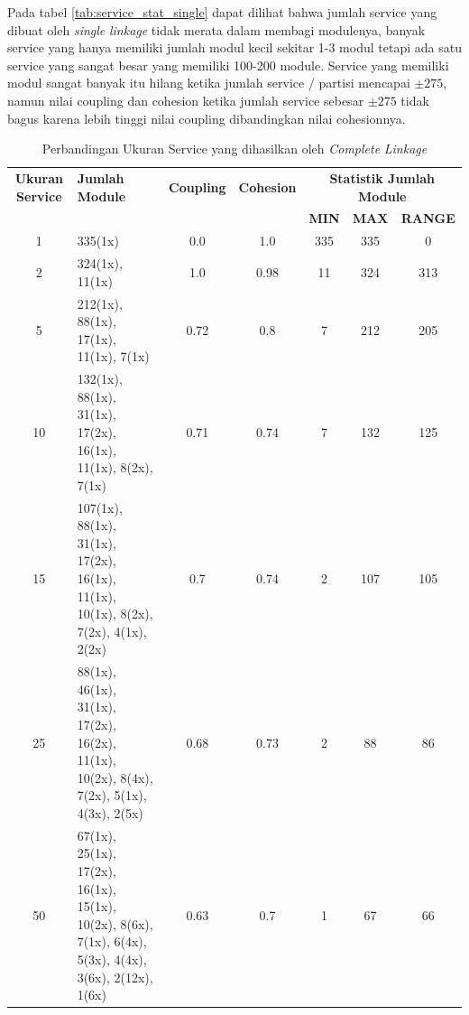 Pada tabel \ref{tab:service_stat_single} dapat dilihat bahwa jumlah service yang dibuat oleh \textit{single} \textit{linkage} tidak merata dalam membagi modulenya, banyak service yang hanya memiliki jumlah modul kecil sekitar 1-3 modul tetapi ada satu service yang sangat besar yang memiliki 100-200 module. Service yang memiliki modul sangat banyak itu hilang ketika jumlah service / partisi mencapai $\pm 275$, namun nilai coupling dan cohesion ketika jumlah service sebesar $\pm 275$ tidak bagus karena lebih tinggi nilai coupling dibandingkan nilai cohesionnya.


\begingroup
\setlength{\LTleft}{-20cm plus -1fill}
\setlength{\LTright}{\LTleft}
\begin{small}
\begin{longtable}{|c|p{4cm}|c|c|c|c|c|}
		\caption{Perbandingan Ukuran Service yang dihasilkan oleh \textit{Complete} \textit{Linkage}}
		\label{tab:service_stat_complete} \\
		\hline
		\textbf{Ukuran Service} & \textbf{Jumlah Module} & \textbf{Coupling} & \textbf{Cohesion} & \multicolumn{3}{c|}{\textbf{Statistik Jumlah Module}} \\
		\cline{5-7}
		&  &  &  & \textbf{MIN} & \textbf{MAX} & \textbf{RANGE} \\
		\hline
		\endfirsthead
		\hline  
		1 & 335(1x) & \cellcolor{colorGood}  0.0 & \cellcolor{colorGood} 1.0 & 335 & 335 & \cellcolor{colorGood} 0 \\   \hline
2 & 324(1x), 11(1x) & \cellcolor{colorBad}  1.0 & \cellcolor{colorBad} 0.98 & 11 & 324 & \cellcolor{colorBad} 313 \\   \hline
5 & 212(1x), 88(1x), 17(1x), 11(1x), 7(1x) & \cellcolor{colorOK}  0.72 & \cellcolor{colorOK} 0.8 & 7 & 212 & \cellcolor{colorBad} 205 \\   \hline
10 & 132(1x), 88(1x), 31(1x), 17(2x), 16(1x), 11(1x), 8(2x), 7(1x) & \cellcolor{colorOK}  0.71 & \cellcolor{colorOK} 0.74 & 7 & 132 & \cellcolor{colorBad} 125 \\   \hline
15 & 107(1x), 88(1x), 31(1x), 17(2x), 16(1x), 11(1x), 10(1x), 8(2x), 7(2x), 4(1x), 2(2x) & \cellcolor{colorOK}  0.7 & \cellcolor{colorOK} 0.74 & 2 & 107 & \cellcolor{colorBad} 105 \\   \hline
25 & 88(1x), 46(1x), 31(1x), 17(2x), 16(2x), 11(1x), 10(2x), 8(4x), 7(2x), 5(1x), 4(3x), 2(5x) & \cellcolor{colorOK}  0.68 & \cellcolor{colorOK} 0.73 & 2 & 88 & \cellcolor{colorBad} 86 \\   \hline
50 & 67(1x), 25(1x), 17(2x), 16(1x), 15(1x), 10(2x), 8(6x), 7(1x), 6(4x), 5(3x), 4(4x), 3(6x), 2(12x), 1(6x) & \cellcolor{colorOK}  0.63 & \cellcolor{colorOK} 0.7 & 1 & 67 & \cellcolor{colorBad} 66 \\   \hline

\end{longtable}
\end{small}
